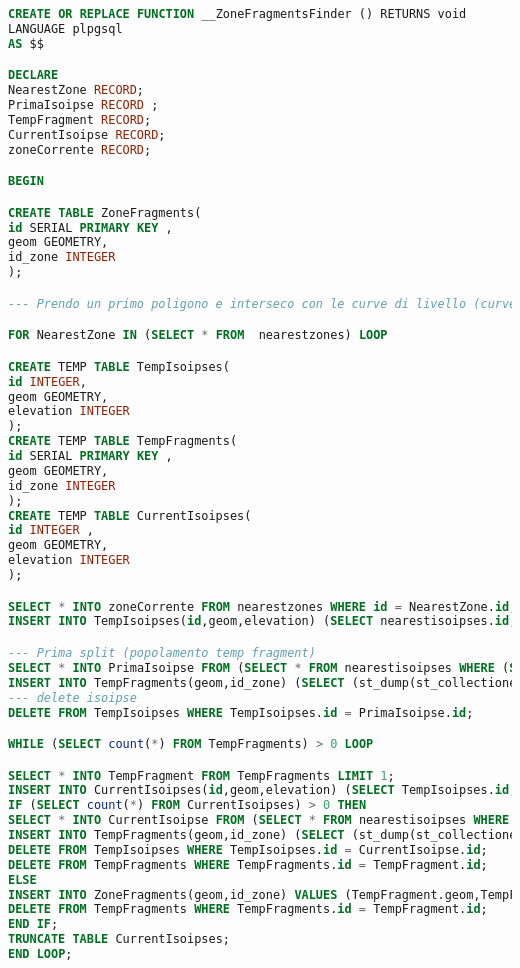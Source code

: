 \begin{lstlisting}[language=SQL]
CREATE OR REPLACE FUNCTION __ZoneFragmentsFinder () RETURNS void
LANGUAGE plpgsql
AS $$

DECLARE
NearestZone RECORD;
PrimaIsoipse RECORD ;
TempFragment RECORD;
CurrentIsoipse RECORD;
zoneCorrente RECORD;

BEGIN

CREATE TABLE ZoneFragments(
id SERIAL PRIMARY KEY ,
geom GEOMETRY,
id_zone INTEGER
);

--- Prendo un primo poligono e interseco con le curve di livello (curve risultanti dall'intersezione con il buffer)

FOR NearestZone IN (SELECT * FROM  nearestzones) LOOP

CREATE TEMP TABLE TempIsoipses(
id INTEGER,
geom GEOMETRY,
elevation INTEGER
);
CREATE TEMP TABLE TempFragments(
id SERIAL PRIMARY KEY ,
geom GEOMETRY,
id_zone INTEGER
);
CREATE TEMP TABLE CurrentIsoipses(
id INTEGER ,
geom GEOMETRY,
elevation INTEGER
);

SELECT * INTO zoneCorrente FROM nearestzones WHERE id = NearestZone.id;
INSERT INTO TempIsoipses(id,geom,elevation) (SELECT nearestisoipses.id,(st_dump(st_collectionextract(st_intersection(nearestisoipses.geom,zoneCorrente.geom),2))).geom as geom,nearestisoipses.elevation FROM nearestisoipses);

--- Prima split (popolamento temp fragment)
SELECT * INTO PrimaIsoipse FROM (SELECT * FROM nearestisoipses WHERE (SELECT id From TempIsoipses LIMIT 1) = nearestisoipses.id) as prima;
INSERT INTO TempFragments(geom,id_zone) (SELECT (st_dump(st_collectionextract(st_split(zoneCorrente.geom,PrimaIsoipse.geom),3))).geom , zoneCorrente.id);
--- delete isoipse
DELETE FROM TempIsoipses WHERE TempIsoipses.id = PrimaIsoipse.id;

WHILE (SELECT count(*) FROM TempFragments) > 0 LOOP

SELECT * INTO TempFragment FROM TempFragments LIMIT 1;
INSERT INTO CurrentIsoipses(id,geom,elevation) (SELECT TempIsoipses.id,(st_dump(st_collectionextract(st_intersection(TempIsoipses.geom,TempFragment.geom),2))).geom as geom,TempIsoipses.elevation FROM TempIsoipses);
IF (SELECT count(*) FROM CurrentIsoipses) > 0 THEN
SELECT * INTO CurrentIsoipse FROM (SELECT * FROM nearestisoipses WHERE (SELECT id From CurrentIsoipses LIMIT 1) = nearestisoipses.id) as currentiso;
INSERT INTO TempFragments(geom,id_zone) (SELECT (st_dump(st_collectionextract(st_split(TempFragment.geom,CurrentIsoipse.geom),3))).geom, zoneCorrente.id);
DELETE FROM TempIsoipses WHERE TempIsoipses.id = CurrentIsoipse.id;
DELETE FROM TempFragments WHERE TempFragments.id = TempFragment.id;
ELSE
INSERT INTO ZoneFragments(geom,id_zone) VALUES (TempFragment.geom,TempFragment.id_zone);
DELETE FROM TempFragments WHERE TempFragments.id = TempFragment.id;
END IF;
TRUNCATE TABLE CurrentIsoipses;
END LOOP;


\end{lstlisting}
